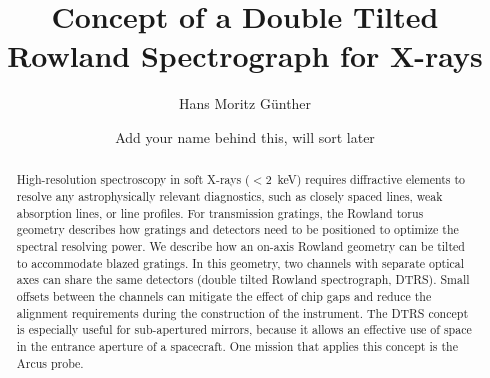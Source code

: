 \documentclass[linenumbers]{aastex631}
\begin{document}
\title{Concept of a Double Tilted Rowland Spectrograph for X-rays}





\author[0000-0003-4243-2840]{Hans Moritz G{\"u}nther}


\author{Add your name behind this, will sort later}
\affiliation{}

\begin{abstract}
High-resolution spectroscopy in soft X-rays ($<2$~keV) requires diffractive elements to resolve any astrophysically relevant diagnostics, such as closely spaced lines, weak absorption lines, or line profiles. For transmission gratings, the Rowland torus geometry describes how gratings and detectors need to be positioned to optimize the spectral resolving power. We describe how an on-axis Rowland geometry can be tilted to accommodate blazed gratings. In this geometry, two channels with separate optical axes can share the same detectors (double tilted Rowland spectrograph, DTRS). Small offsets between the channels can mitigate the effect of chip gaps and reduce the alignment requirements during the construction of the instrument. The DTRS concept is especially useful for sub-apertured mirrors, because it allows an effective use of space in the entrance aperture of a spacecraft.
One mission that applies this concept is the Arcus probe.

\end{abstract}

\end{document}
